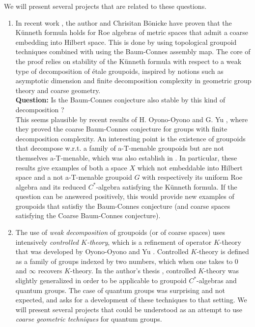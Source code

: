 We will present several projects that are related to these questions. 
\begin{enumerate}
\item In recent work \cite{DelBo18}, the author and Chrisitan B\"onicke have proven that the K\"unneth formula holds for Roe algebras of metric spaces that admit a coarse embedding into Hilbert space. This is done by using topological groupoid techniques combined with using the Baum-Connes assembly map. The core of the proof relies on stability of the K\"unneth formula with respect to a weak type of decomposition of \'etale groupoids, inspired by notions such as asymptotic dimension and finite decomposition complexity in geometric group theory and coarse geometry. \\

\textbf{Question:} Is the Baum-Connes conjecture also stable by this kind of decomposition ?\\

This seems plausible by recent results of H. Oyono-Oyono and G. Yu \cite{OY3}, where they proved the coarse Baum-Connes conjecture for groups with finite decomposition complexity. An interesting point is the existence of groupoids that decompose w.r.t. a family of a-T-menable groupoids but are not themselves a-T-menable, which was also establish in \cite{DelBo18}. In particular, these results give examples of both a space $X$ which not embeddable into Hilbert space and a not a-T-menable groupoid $G$ with respectively its uniform Roe algebra and its reduced $C^*$-algebra satisfying the K\"unneth formula. If the question can be answered positively, this would provide new examples of groupoids that satisfiy the Baum-Connes conjecture (and coarse spaces satisfying the Coarse Baum-Connes conjecture).     

\item The use of \textit{weak decomposition} of groupoids (or of coarse spaces) uses intensively \textit{controlled $K$-theory}, which is a refinement of operator $K$-theory that was developed by Oyono-Oyono and Yu \cite{OY2}. Controlled $K$-theory is defined as a family of groups indexed by two numbers, which when one takes to $0$ and $\infty$ recovers $K$-theory. In the author's thesis \cite{dell2018controlled}, controlled $K$-theory was slightly generalized in order to be applicable to groupoid $C^*$-algebras and quantum groups. The case of quantum groups was surprising and not expected, and asks for a development of these techniques to that setting. We will present several projects that could be understood as an attempt to use \textit{coarse geometric techniques} for quantum groups.  
\end{enumerate}

